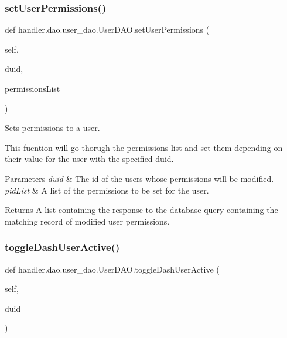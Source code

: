 \subsubsection{\texorpdfstring{set\+User\+Permissions()}{setUserPermissions()}}
{\footnotesize\ttfamily def handler.\+dao.\+user\+\_\+dao.\+User\+D\+A\+O.\+set\+User\+Permissions (\begin{DoxyParamCaption}\item[{}]{self,  }\item[{}]{duid,  }\item[{}]{permissions\+List }\end{DoxyParamCaption})}



Sets permissions to a user. 

This fucntion will go thorugh the permissions list and set them depending on their value for the user with the specified duid.


\begin{DoxyParams}{Parameters}
{\em duid} & The id of the user\textquotesingle{}s whose permissions will be modified. \\
\hline
{\em pid\+List} & A list of the permissions to be set for the user.\\
\hline
\end{DoxyParams}
\begin{DoxyReturn}{Returns}
A list containing the response to the database query containing the matching record of modified user permissions. 
\end{DoxyReturn}
\mbox{\label{classhandler_1_1dao_1_1user__dao_1_1_user_d_a_o_a7d3f0c6b17a15ea1bc3eb883d03ea0e8}} 
\subsubsection{\texorpdfstring{toggle\+Dash\+User\+Active()}{toggleDashUserActive()}}
{\footnotesize\ttfamily def handler.\+dao.\+user\+\_\+dao.\+User\+D\+A\+O.\+toggle\+Dash\+User\+Active (\begin{DoxyParamCaption}\item[{}]{self,  }\item[{}]{duid }\end{DoxyParamCaption})}



